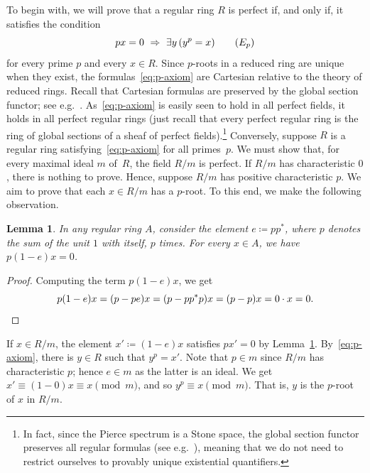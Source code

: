 \documentclass[a4paper,10pt,reqno]{amsart}
\newtheorem{lemma}[theorem]{Lemma}
\theoremstyle{definition}
\theoremstyle{remark}
\newcommand{\IMP}{\Rightarrow}						%
\begin{document}
To begin with, we will prove that a regular ring $R$ is perfect if, and only if, it satisfies the condition
\begin{equation}\label{eq:p-axiom}
px = 0 \ \IMP \ \exists y \, (y^{p}=x) \tag{$E_{p}$}
\end{equation}
for every prime $p$ and every $x\in R$.
%
Since $p$-roots in a reduced ring are unique when they exist, the formulas~\eqref{eq:p-axiom} are Cartesian relative to the theory of reduced rings. Recall that Cartesian formulas are preserved by the global section functor; see e.g.\ \cite[\S V.1.12]{Johnstone1982}. As~\eqref{eq:p-axiom} is easily seen to hold in all perfect fields, it holds in all perfect regular rings (just recall that every perfect regular ring is the ring of global sections of a sheaf of perfect fields).\footnote{In fact, since the Pierce spectrum is a Stone space, the global section functor preserves all regular formulas (see e.g.\ \cite[\S V.1.13]{Johnstone1982}), meaning that we do not need to restrict ourselves to provably unique existential quantifiers.} Conversely, suppose $R$ is a regular ring satisfying~\eqref{eq:p-axiom} for all primes~$p$. We must show that, for every maximal ideal $m$ of~$R$, the field $R/m$ is perfect. If $R/m$ has characteristic $0$, there is nothing to prove. Hence, suppose $R/m$ has positive characteristic $p$. We aim to prove that each $x\in R/m$ has a $p$-root. To this end, we make the following observation.
%
\begin{lemma}\label{l:lifting-p-annihilation}
In any regular ring $A$, consider the element $e\coloneqq pp^{*}$, where $p$ denotes the sum of the unit $1$ with itself, $p$ times. For every $x\in A$, we have $p(1-e)x=0$. 
\end{lemma}

\begin{proof}
Computing the term $p(1-e)x$, we get
\[
p(1-e)x = (p-pe)x = (p-pp^{*}p)x=(p-p)x=0\cdot x =0.\qedhere
\]
\end{proof}

If $x\in R/m$, the element $x'\coloneqq (1-e)x$ satisfies $px'=0$ by Lemma~\ref{l:lifting-p-annihilation}. By~\eqref{eq:p-axiom}, there is $y\in R$ such that $y^{p}=x'$. Note that $p\in m$ since $R/m$ has characteristic $p$; hence $e\in m$ as the latter is an ideal. We get $x'\equiv (1-0)x \equiv x \pmod{m}$, and so $y^{p}\equiv x \pmod{m}$. That is, $y$ is the $p$-root of $x$ in $R/m$.
\end{document}
